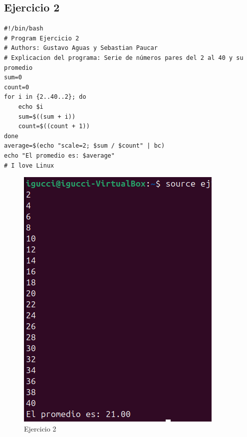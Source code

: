 \documentclass[11pt,twoside]{book}
\begin{document}
\subsection{Ejercicio 2}
\begin{lstlisting}
#!/bin/bash
# Program Ejercicio 2
# Authors: Gustavo Aguas y Sebastian Paucar
# Explicacion del programa: Serie de números pares del 2 al 40 y su promedio
sum=0
count=0
for i in {2..40..2}; do
    echo $i
    sum=$((sum + i))
    count=$((count + 1))
done
average=$(echo "scale=2; $sum / $count" | bc)
echo "El promedio es: $average"
# I love Linux
\end{lstlisting}
\begin{figure}
    \centering
    \includegraphics[width=0.75\linewidth]{series/ej2.png}
    \caption{Ejercicio 2}
\end{figure}
\newpage
\end{document}

